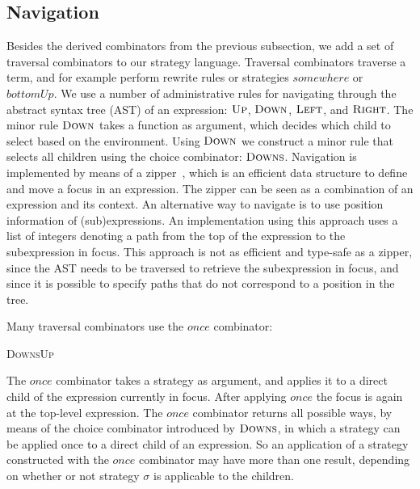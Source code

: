 \documentclass[copyright]{eptcs}
\newcommand{\Varid}[1]{\mathit{#1}}
\def\resethooks{\global\let\SaveRestoreHook\empty
  \global\let\ColumnHook\empty}
\let\hspost\empty
\begin{document}
\subsection{Navigation}
\label{ssec:navi}
Besides the derived combinators from the previous subsection, we add a set of
traversal combinators to our strategy language. Traversal combinators traverse a
term, and for example perform rewrite rules or strategies \ensuremath{\Varid{somewhere}} or
\ensuremath{\Varid{bottomUp}}. We use a number of administrative rules for navigating through the
abstract syntax tree (AST) of an expression: \ensuremath{\textsc{Up}}, \ensuremath{\textsc{Down}}, \ensuremath{\textsc{Left}}, and \ensuremath{\textsc{Right}}.
The minor rule \ensuremath{\textsc{Down}} takes a function as argument, which decides which child to
select based on the environment. Using \ensuremath{\textsc{Down}} we construct a minor rule that
selects all children using the choice combinator: \ensuremath{\textsc{Downs}}. Navigation is
implemented by means of a zipper~\cite{huet_zipper}, which is an efficient data
structure to define and move a focus in an expression. The zipper can be seen as
a combination of an expression and its context. An alternative way to navigate
is to use position information of (sub)expressions. An implementation using this
approach uses a list of integers denoting a path from the top of the expression
to the subexpression in focus. This approach is not as efficient and type-safe
as a zipper, since the AST needs to be traversed to retrieve the subexpression
in focus, and since it is possible to specify paths that do not correspond to a
position in the tree.

Many traversal combinators use the \ensuremath{\Varid{once}} combinator:
\begin{hscode}\SaveRestoreHook
\column{B}{@{}>{\hspre}l<{\hspost}@{}}\column{4}{@{}>{\hspre}l<{\hspost}@{}}\column{14}{@{}>{\hspre}l<{\hspost}@{}}\column{E}{@{}>{\hspre}l<{\hspost}@{}}\>[4]{}\Varid{once}\;\sigma\mathrel{=}{}\<[14]\>[14]{}\textsc{Downs}\mathrel{{<}\hspace{-0.4em}\star\hspace{-0.4em}{>}}\sigma\mathrel{{<}\hspace{-0.4em}\star\hspace{-0.4em}{>}}\textsc{Up}{}\<[E]\ColumnHook
\end{hscode}\resethooks
The \ensuremath{\Varid{once}} combinator takes a strategy as argument, and applies it to a direct
child of the expression currently in focus. After applying \ensuremath{\Varid{once}} the focus is
again at the top-level expression. The \ensuremath{\Varid{once}} combinator returns all possible
ways, by means of the choice combinator introduced by \ensuremath{\textsc{Downs}}, in which a
strategy can be applied once to a direct child of an expression. So an
application of a strategy constructed with the \ensuremath{\Varid{once}} combinator may have more
than one result, depending on whether or not strategy \ensuremath{\sigma} is applicable to the
children.
\end{document}
